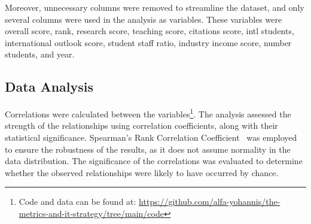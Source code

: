 \documentclass[conference]{IEEEtran}
\begin{document}
Moreover, unnecessary columns were removed to streamline the dataset, and only several columns were used in the analysis as variables. These variables were overall score, rank, research score, teaching score, citations score, intl students, international outlook score, student staff ratio, industry income score, number students, and year. 

\subsection{Data Analysis}

Correlations were calculated between the variables\footnote{Code and data can be found at:
		\url{https://github.com/alfa-yohannis/the-metrics-and-it-strategy/tree/main/code}
}. 
The analysis assessed the strength of the relationships using correlation coefficients, along with their statistical significance. Spearman's Rank Correlation Coefficient~\cite{spearman1904general} was employed to ensure the robustness of the results, as it does not assume normality in the data distribution. The significance of the correlations was evaluated to determine whether the observed relationships were likely to have occurred by chance. 
\end{document}
